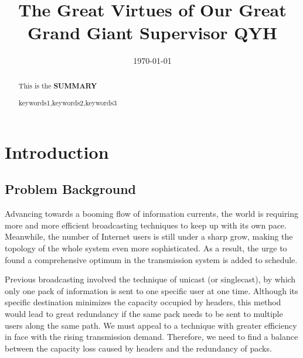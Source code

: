 \documentclass{mcmthesis}
\begin{document}
\linespread{0.6} %
\setlength{\parskip}{0.5\baselineskip} %
\title{The Great Virtues of Our Great Grand Giant Supervisor QYH}

\date{\today}
\begin{abstract}
 		This is the \textbf{SUMMARY}

	\begin{keywords}
	keywords1,keywords2,keywords3
	\end{keywords}
\end{abstract}

\maketitle

\tableofcontents
\newpage

\section{Introduction}

\subsection{Problem Background}

 Advancing towards a booming flow of information currents, the world is
 requiring more and more efficient broadcasting techniques to keep up with its
 own pace. Meanwhile, the number of Internet users is still under a sharp grow,
 making the topology of the whole system even more sophisticated. As a result,
 the urge to found a comprehensive optimum in the transmission system is added
 to schedule.
 
 Previous broadcasting involved the technique of unicast (or singlecast), by which
 only one pack of information is sent to one specific user at one time. Although
 its specific destination minimizes the capacity occupied by headers, this method
 would lead to great redundancy if the same pack needs to be sent to multiple users
 along the same path. We must appeal to a technique with greater efficiency in face
 with the rising transmission demand. Therefore, we need to find a balance between
 the capacity loss caused by headers and the redundancy of packs.
\end{document}
